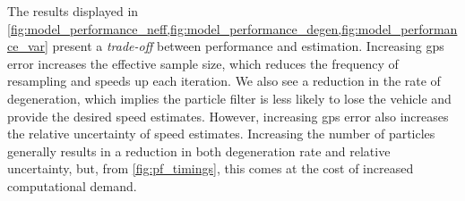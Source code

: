 The results displayed in \cref{fig:model_performance_neff,fig:model_performance_degen,fig:model_performance_var} present a \emph{trade-off} between performance and estimation. Increasing \gls{gps} error increases the effective sample size, which reduces the frequency of resampling and speeds up each iteration. We also see a reduction in the rate of degeneration, which implies the particle filter is less likely to lose the vehicle and provide the desired speed estimates. However, increasing \gls{gps} error also increases the relative uncertainty of speed estimates. Increasing the number of particles generally results in a reduction in both degeneration rate and relative uncertainty, but, from \cref{fig:pf_timings}, this comes at the cost of increased computational demand.
